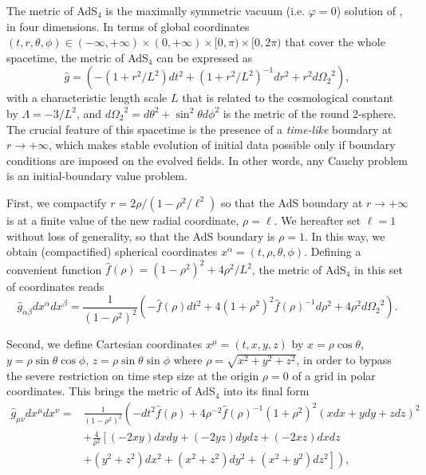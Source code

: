 \documentclass[12pt]{iopart} %
\begin{document}
The metric of AdS$_4$ is the maximally symmetric vacuum (i.e. $\varphi=0$) solution of , in four dimensions.
In terms of global coordinates $(t,r,\theta,\phi)\in(-\infty,+\infty)\times(0,+\infty)\times[0,\pi)\times[0,2\pi)$ that cover the whole spacetime, the metric of AdS$_4$ can be expressed as
\begin{equation}\label{eqn:ads4}
\hat{g}= \left( -(1+r^2/L^2) dt^2 + (1+r^2/L^2)^{-1} dr^2 +r^2 d{\Omega_2}^2 \right), \nonumber
\end{equation}
with a characteristic length scale $L$ that is related to the cosmological constant by $\Lambda = - 3/L^2$, and $d{\Omega_2}^2 = d\theta^2 + \sin^2\theta d\phi^2$ is the metric of the round 2-sphere. The crucial feature of this spacetime is the presence of a \emph{time-like} boundary at $r \rightarrow +\infty$, which makes stable evolution of initial data possible only if boundary conditions are imposed on the evolved fields. In other words, any Cauchy problem is an initial-boundary value problem.

First, we compactify $r=2\rho/(1-\rho^2/\ell^2)$ so that the AdS boundary at $r \rightarrow +\infty$ is at a finite value of the new radial coordinate, $\rho=\ell$.
We hereafter set $\ell=1$ without loss of generality, so that the AdS boundary is $\rho=1$. In this way, we obtain (compactified) spherical coordinates $x^\alpha=(t,\rho,\theta,\phi)$.
Defining a convenient function $\hat{f}(\rho) = (1-\rho^2)^2+4\rho^2/L^2$, the metric of AdS$_4$ in this set of coordinates reads
\begin{equation}\label{eqn:ads4_compact}
\hat{g}_{\alpha\beta}dx^{\alpha}dx^{\beta} = \frac{1}{(1-\rho^2)^2} \left( -\hat{f}(\rho) dt^2 + 4(1+\rho^2)^2 \hat{f}(\rho)^{-1} d\rho^2 + 4\rho^2 d{\Omega_2}^2 \right). \nonumber
\end{equation}

Second, we define Cartesian coordinates $x^\mu=(t,x,y,z)$ by $x=\rho\cos\theta$, $y=\rho\sin\theta\cos\phi$, $z=\rho\sin\theta\sin\phi$ where $\rho=\sqrt{x^2+y^2+z^2}$, in order to bypass the severe restriction on time step size at the origin $\rho=0$ of a grid in polar coordinates. 
This brings the metric of AdS$_4$ into its final form
\begin{eqnarray}\label{eqn:ads4_final}
\hat{g}_{\mu\nu}dx^{\mu}dx^{\nu}=&\frac{1}{\left(1-\rho^2\right)^2 }\left( -dt^2 \hat{f}(\rho) +4\rho^{-2}\hat{f}(\rho)^{-1} \left(1+\rho^2\right)^2 (x dx + y dy + z dz)^2 \right. \nonumber \\
&+\frac{4}{\rho^2} \left[\left(-2 x y\right) dx dy + \left(- 2 y z\right) dy dz + \left(- 2 x z\right) dx dz \right. \nonumber \\
&\left. \left. + \left(y^2+z^2\right) dx^2 + \left(x^2+z^2\right) dy^2 + \left(x^2+y^2\right) dz^2 \right] \right),
\end{eqnarray}
\end{document}
